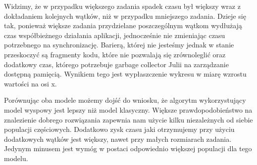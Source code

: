 Widzimy, że w przypadku większego zadania spadek czasu był większy wraz z dokładaniem kolejnych wątków, niż w przypadku mniejszego zadania. Dzieje się 
tak, ponieważ większe zadania przydzielane poszczególnym wątkom wydłużają czas współbieżnego działania aplikacji, jednocześnie nie zmieniając czasu
potrzebnego na synchronizację. Barierą, której nie jesteśmy jednak w stanie przeskoczyć 
są fragmenty kodu, które nie pozwalają się zrównoleglić oraz dodatkowy czas, którego potrzebuje garbage collector Julii na zarządzanie dostępną pamięcią. 
Wynikiem tego jest wypłaszczenie wykresu w miarę wzrostu wartości na osi x.

Porównując oba modele możemy dojść do wniosku, że algorytm wykorzystujący model wyspowy jest lepszy niż model klasyczny. Większe prawdopodobieństwo 
na znalezienie dobrego rozwiązania zapewnia nam użycie kilku niezależnych od siebie populacji częściowych. Dodatkowo zysk czasu jaki otrzymujemy 
przy użyciu dodatkowych wątków jest większy, nawet przy małych rozmiarach zadania. Jedynym minusem jest wymóg w postaci odpowiednio większej 
populacji dla tego modelu. 